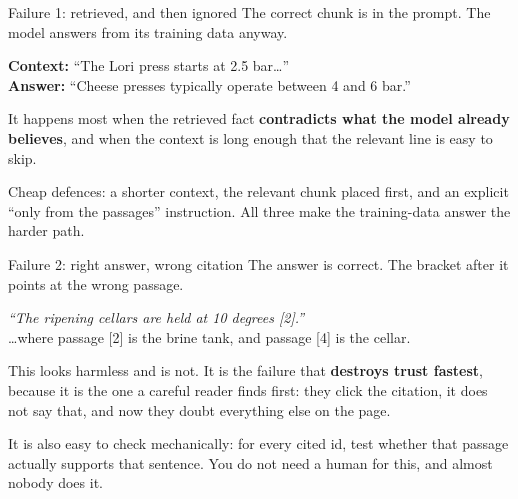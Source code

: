 \documentclass[aspectratio=169]{beamer}
\newcommand{\takebox}[1]{%
  \begin{tcolorbox}[colback=paramgreen!8, colframe=paramgreen, boxrule=0.6pt, arc=2pt]
  #1
  \end{tcolorbox}}
\newcommand{\watchbox}[1]{%
  \begin{tcolorbox}[colback=armorange!12, colframe=armorange, boxrule=0.6pt, arc=2pt]
  #1
  \end{tcolorbox}}
\begin{document}
\begin{frame}{Failure 1: retrieved, and then ignored}
  \vspace{0.7em}
  The correct chunk is in the prompt. The model answers from its training data anyway.

  \vspace{0.9em}
  \begin{center}
  \begin{tcolorbox}[colback=lightbg, colframe=gray, boxrule=0.5pt, arc=2pt, width=0.9\textwidth]
    \small
    \textbf{Context:} ``The Lori press starts at 2.5 bar\ldots''\\
    \textbf{Answer:} ``Cheese presses typically operate between 4 and 6 bar.''
  \end{tcolorbox}
  \end{center}

  \vspace{0.9em}
  It happens most when the retrieved fact \textbf{contradicts what the model already
  believes}, and when the context is long enough that the relevant line is easy to skip.

  \vspace{0.8em}
  \takebox{Cheap defences: a shorter context, the relevant chunk placed first, and an
  explicit ``only from the passages'' instruction. All three make the training-data answer
  the harder path.}
\end{frame}

\begin{frame}{Failure 2: right answer, wrong citation}
  \vspace{0.7em}
  The answer is correct. The bracket after it points at the wrong passage.

  \vspace{0.9em}
  \begin{center}
  \begin{tcolorbox}[colback=lightbg, colframe=gray, boxrule=0.5pt, arc=2pt, width=0.9\textwidth]
    \small
    \textit{``The ripening cellars are held at 10 degrees [2].''}\\[0.3em]
    \ldots where passage [2] is the brine tank, and passage [4] is the cellar.
  \end{tcolorbox}
  \end{center}

  \vspace{0.9em}
  This looks harmless and is not. It is the failure that \textbf{destroys trust fastest},
  because it is the one a careful reader finds first: they click the citation, it does not
  say that, and now they doubt everything else on the page.

  \vspace{0.8em}
  \watchbox{It is also easy to check mechanically: for every cited id, test whether that
  passage actually supports that sentence. You do not need a human for this, and almost
  nobody does it.}
\end{frame}
\end{document}
